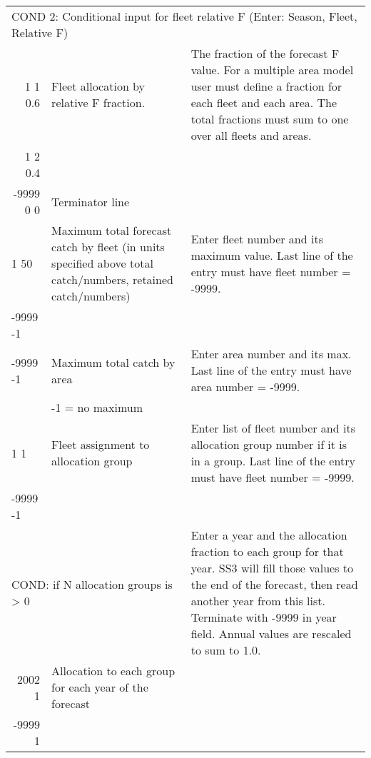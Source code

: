 \begin{landscape}
{\begin{longtable}{p{3.2cm} p{7cm} p{10.8cm}}
  \hline 
  \multicolumn{3}{l}{COND 2: Conditional input for fleet relative F (Enter: Season, Fleet, Relative F)} \Tstrut\\
  \multicolumn{1}{r}{1 1 0.6} & Fleet allocation by relative F fraction. & \multirow{1}{1cm}[-0.25cm]{\parbox{11cm}{The fraction of the forecast F value. For a multiple area model user must define a fraction for each fleet and each area. The total fractions must sum to one over all fleets and areas.}} \\
  \multicolumn{1}{r}{1 2 0.4} & & \\
  \multicolumn{1}{r}{-9999 0 0} & Terminator line & \Bstrut\\ 

  \hline
  1 50 & Maximum total forecast catch by fleet (in units specified above total catch/numbers, retained catch/numbers) & \multirow{1}{1cm}[-0.25cm]{\parbox{11cm}{Enter fleet number and its maximum value. Last line of the entry must have fleet number = -9999.}} \Tstrut\\
  -9999 -1 & & \Bstrut\\
  \hline

  -9999 -1 & Maximum total catch by area & \multirow{1}{1cm}[-0.25cm]{\parbox{11cm}{Enter area number and its max. Last line of the entry must have area number = -9999.}} \Tstrut\\
    & -1 = no maximum & \Bstrut\\

  \hline
  1 1 & Fleet assignment to allocation group & \multirow{1}{1cm}[-0.25cm]{\parbox{11cm}{Enter list of fleet number and its allocation group number if it is in a group. Last line of the entry must have fleet number = -9999.}} \Tstrut\\
  -9999 -1 & & \Bstrut\\ 

  \multicolumn{2}{l}{COND: if N allocation groups is > 0} & \multirow{1}{1cm}[-0.25cm]{\parbox{11cm}{Enter a year and the allocation fraction to each group for that year. SS3 will fill those values to the end of the forecast, then read another year from this list. Terminate with -9999 in year field. Annual values are rescaled to sum to 1.0.}} \Tstrut \\
  \multicolumn{1}{r}{2002 1} & Allocation to each group for each year of the forecast & \\
  \multicolumn{1}{r}{-9999 1} & & \Bstrut\\


\end{longtable}}
\end{landscape}
